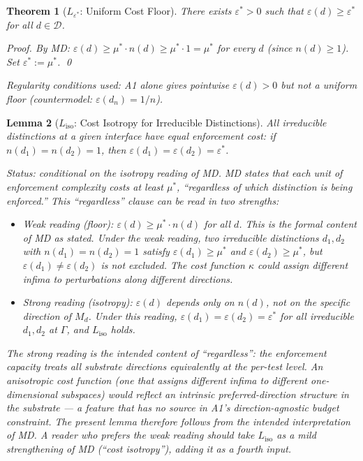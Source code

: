 \documentclass[11pt,a4paper]{article}
\newtheorem{theorem}{Theorem}[section]
\newtheorem{lemma}[theorem]{Lemma}
\theoremstyle{definition}
\newcommand{\eps}{\varepsilon}
\begin{document}
\begin{theorem}[$L_{\eps^*}$: Uniform Cost Floor]\label{thm:Leps}
There exists $\eps^* > 0$ such that $\eps(d) \ge \eps^*$ for all $d \in \mathcal{D}$.

\noindent\textit{Proof.}  By MD: $\eps(d) \ge \mu^* \cdot n(d) \ge \mu^* \cdot 1 = \mu^*$ for every $d$ (since $n(d) \ge 1$).  Set $\eps^* := \mu^*$.  \qed

\noindent\textit{Regularity conditions used:}   A1 alone gives pointwise $\eps(d) > 0$ but not a uniform floor (countermodel: $\eps(d_n) = 1/n$).
\end{theorem}

\begin{lemma}[$L_{\mathrm{iso}}$: Cost Isotropy for Irreducible Distinctions]\label{lem:iso}
All irreducible distinctions at a given interface have equal enforcement cost: if $n(d_1) = n(d_2) = 1$, then $\eps(d_1) = \eps(d_2) = \eps^*$.

\smallskip\noindent\textit{Status: conditional on the isotropy reading of MD.}  MD states that each unit of enforcement complexity costs at least $\mu^*$, ``regardless of which distinction is being enforced.''  This ``regardless'' clause can be read in two strengths:

\begin{itemize}[nosep,leftmargin=2em,itemsep=3pt]
\item \textit{Weak reading (floor):} $\eps(d) \ge \mu^* \cdot n(d)$ for all $d$.  This is the formal content of MD as stated.  Under the weak reading, two irreducible distinctions $d_1, d_2$ with $n(d_1) = n(d_2) = 1$ satisfy $\eps(d_1) \ge \mu^*$ and $\eps(d_2) \ge \mu^*$, but $\eps(d_1) \ne \eps(d_2)$ is not excluded.  The cost function $\kappa$ could assign different infima to perturbations along different directions.
\item \textit{Strong reading (isotropy):} $\eps(d)$ depends only on $n(d)$, not on the specific direction of $M_d$.  Under this reading, $\eps(d_1) = \eps(d_2) = \eps^*$ for all irreducible $d_1, d_2$ at $\Gamma$, and $L_{\mathrm{iso}}$ holds.
\end{itemize}

The strong reading is the intended content of ``regardless'': the enforcement capacity treats all substrate directions equivalently at the per-test level.  An anisotropic cost function (one that assigns different infima to different one-dimensional subspaces) would reflect an intrinsic preferred-direction structure in the substrate --- a feature that has no source in A1's direction-agnostic budget constraint.  The present lemma therefore follows from the intended interpretation of MD.  A reader who prefers the weak reading should take $L_{\mathrm{iso}}$ as a mild strengthening of MD (``cost isotropy''), adding it as a fourth input.


\end{lemma}
\end{document}
